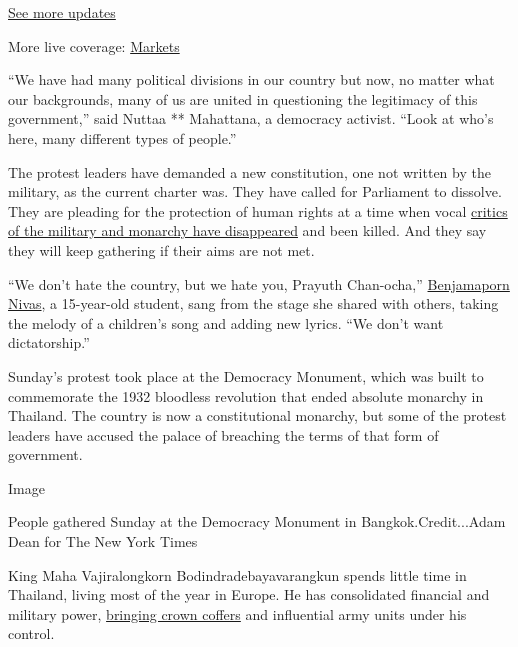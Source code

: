 \href{https://www.nytimes3xbfgragh.onion/2020/09/11/world/covid-19-coronavirus.html?action=click\&pgtype=Article\&state=default\&region=MAIN_CONTENT_1\&context=storylines_live_updates}{See
more updates}

More live coverage:
\href{https://www.nytimes3xbfgragh.onion/live/2020/09/11/business/stock-market-today-coronavirus?action=click\&pgtype=Article\&state=default\&region=MAIN_CONTENT_1\&context=storylines_live_updates}{Markets}

``We have had many political divisions in our country but now, no matter
what our backgrounds, many of us are united in questioning the
legitimacy of this government,'' said Nuttaa ** Mahattana, a democracy
activist. ``Look at who's here, many different types of people.''

The protest leaders have demanded a new constitution, one not written by
the military, as the current charter was. They have called for
Parliament to dissolve. They are pleading for the protection of human
rights at a time when vocal
\href{https://www.nytimes3xbfgragh.onion/2020/06/26/world/asia/thailand-dissidents-disappeared-military.html}{critics
of the military and monarchy have disappeared} and been killed. And they
say they will keep gathering if their aims are not met.

``We don't hate the country, but we hate you, Prayuth Chan-ocha,''
\href{https://www.nytimes3xbfgragh.onion/2020/08/11/world/asia/thailand-student-protest-military.html}{Benjamaporn
Nivas}, a 15-year-old student, sang from the stage she shared with
others, taking the melody of a children's song and adding new lyrics.
``We don't want dictatorship.''

Sunday's protest took place at the Democracy Monument, which was built
to commemorate the 1932 bloodless revolution that ended absolute
monarchy in Thailand. The country is now a constitutional monarchy, but
some of the protest leaders have accused the palace of breaching the
terms of that form of government.

Image

People gathered Sunday at the Democracy Monument in
Bangkok.Credit...Adam Dean for The New York Times

King Maha Vajiralongkorn Bodindradebayavarangkun spends little time in
Thailand, living most of the year in Europe. He has consolidated
financial and military power,
\href{https://www.nytimes3xbfgragh.onion/2018/06/17/world/asia/thailand-king-assets.html}{bringing
crown coffers} and influential army units under his control.

